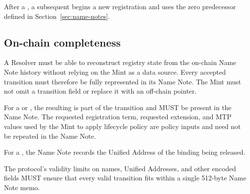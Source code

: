 After a , a subsequent  begins a new registration and uses the zero predecessor defined in Section~\ref{sec:name-notes}.

\subsection{On-chain completeness}

A Resolver must be able to reconstruct registry state from the on-chain Name Note history without relying on the Mint as a data source. Every accepted transition must therefore be fully represented in its Name Note. The Mint must not omit a transition field or replace it with an off-chain pointer.

For a  or , the resulting  is part of the transition and MUST be present in the Name Note. The requested registration term, requested extension, and MTP values used by the Mint to apply lifecycle policy are policy inputs and need not be repeated in the Name Note.

For a , the Name Note records the Unified Address of the binding being released.

The protocol's validity limits on names, Unified Addresses, and other encoded fields MUST ensure that every valid \zns{} transition fits within a single 512-byte Name Note memo.
